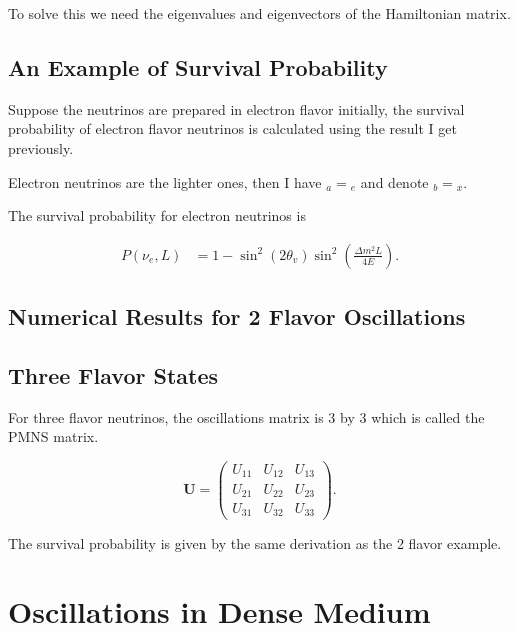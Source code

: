 \documentclass{tufte-handout}
\begin{document}
To solve this we need the eigenvalues and eigenvectors of the Hamiltonian matrix.



\subsection{An Example of Survival Probability}

Suppose the neutrinos are prepared in electron flavor initially, the survival probability of electron flavor neutrinos is calculated using the result I get previously.

Electron neutrinos are the lighter ones, then I have ${}_a = {}_e$ and denote ${}_b={}_x$.

The survival probability for electron neutrinos is

\begin{align*}
P(\nu_e,L) &= 1-\sin^2(2\theta_v)\sin^2\left( \frac{\Delta m^2 L}{4E} \right) .
\end{align*}



\subsection{Numerical Results for 2 Flavor Oscillations}





\subsection{Three Flavor States}

For three flavor neutrinos, the oscillations matrix is 3 by 3 which is called the PMNS matrix.

\begin{equation}
\mathbf U = \begin{pmatrix}
U_{11} & U_{12} & U_{13} \\
U_{21} & U_{22} & U_{23} \\
U_{31} & U_{32} & U_{33}
\end{pmatrix}.
\end{equation}

The survival probability is given by the same derivation as the 2 flavor example.









\section{Oscillations in Dense Medium}
\end{document}
